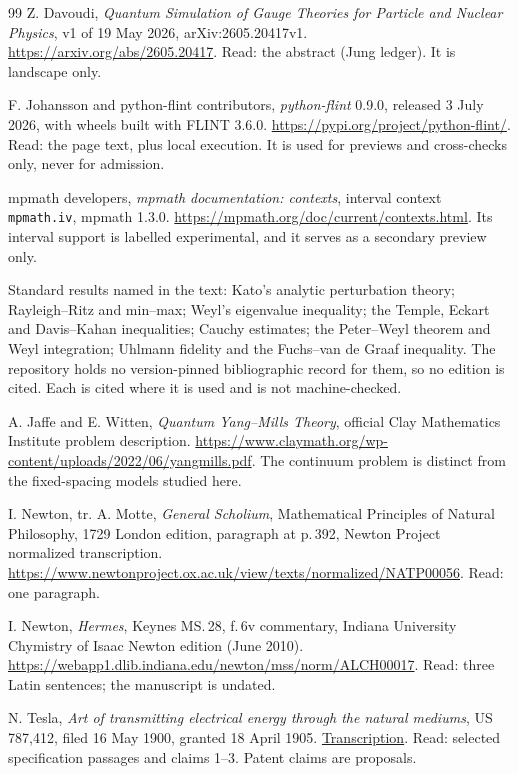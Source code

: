 \begin{thebibliography}{99}
Z. Davoudi,
\emph{Quantum Simulation of Gauge Theories for Particle and Nuclear Physics},
v1 of 19 May 2026, arXiv:2605.20417v1.
\url{https://arxiv.org/abs/2605.20417}.
Read: the abstract (Jung ledger). It is landscape only.

F. Johansson and python-flint contributors, \emph{python-flint} 0.9.0,
released 3 July 2026, with wheels built with FLINT 3.6.0.
\url{https://pypi.org/project/python-flint/}.
Read: the page text, plus local execution. It is used for previews and
cross-checks only, never for admission.

mpmath developers, \emph{mpmath documentation: contexts}, interval context
\texttt{mpmath.iv}, mpmath 1.3.0.
\url{https://mpmath.org/doc/current/contexts.html}.
Its interval support is labelled experimental, and it serves as a secondary
preview only.

Standard results named in the text: Kato's analytic perturbation theory;
Rayleigh--Ritz and min--max; Weyl's eigenvalue inequality; the Temple, Eckart
and Davis--Kahan inequalities; Cauchy estimates; the Peter--Weyl theorem and
Weyl integration; Uhlmann fidelity and the Fuchs--van de Graaf inequality. The repository holds no
version-pinned bibliographic record for them, so no edition is cited. Each is
cited where it is used and is not machine-checked.

A. Jaffe and E. Witten, \emph{Quantum Yang--Mills Theory},
official Clay Mathematics Institute problem description.
\url{https://www.claymath.org/wp-content/uploads/2022/06/yangmills.pdf}.
The continuum problem is distinct from the fixed-spacing models studied here.

I. Newton, tr. A. Motte, \emph{General Scholium}, Mathematical Principles of
Natural Philosophy, 1729 London edition, paragraph at p.\,392,
Newton Project normalized transcription.
\url{https://www.newtonproject.ox.ac.uk/view/texts/normalized/NATP00056}.
Read: one paragraph.

I. Newton, \emph{Hermes}, Keynes MS.\,28, f.\,6v commentary,
Indiana University Chymistry of Isaac Newton edition (June 2010).
\url{https://webapp1.dlib.indiana.edu/newton/mss/norm/ALCH00017}.
Read: three Latin sentences; the manuscript is undated.

N. Tesla, \emph{Art of transmitting electrical energy through the natural
mediums}, US 787,412, filed 16 May 1900, granted 18 April 1905.
\href{https://teslauniverse.com/nikola-tesla/patents/us-patent-787412-art-transmitting-electrical-energy-through-natural-mediums}{Transcription}.
Read: selected specification passages and claims 1--3. Patent claims are
proposals.


\end{thebibliography}
